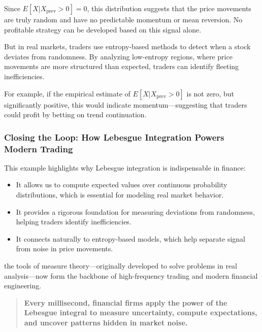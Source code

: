 Since \( E[X | X_{\text{prev}} > 0] = 0 \), this distribution suggests that the price movements are truly random and have no predictable momentum or mean reversion. No profitable strategy can be developed based on this signal alone.

But in real markets, traders use entropy-based methods to detect when a stock deviates from randomness. By analyzing low-entropy regions, where price movements are more structured than expected, traders can identify fleeting inefficiencies.

For example, if the empirical estimate of \( E[X | X_{\text{prev}} > 0] \) is not zero, but significantly positive, this would indicate momentum—suggesting that traders could profit by betting on trend continuation.

\subsubsection*{Closing the Loop: How Lebesgue Integration Powers Modern Trading}

This example highlights why Lebesgue integration is indispensable in finance:

\begin{itemize}
    \item It allows us to compute expected values over continuous probability distributions, which is essential for modeling real market behavior.
    \item It provides a rigorous foundation for measuring deviations from randomness, helping traders identify inefficiencies.
    \item It connects naturally to entropy-based models, which help separate signal from noise in price movements.
\end{itemize}

 the tools of measure theory—originally developed to solve problems in real analysis—now form the backbone of high-frequency trading and modern financial engineering.

\begin{quote}
\textbf{Every millisecond, financial firms apply the power of the Lebesgue integral to measure uncertainty, compute expectations, and uncover patterns hidden in market noise.}
\end{quote}















